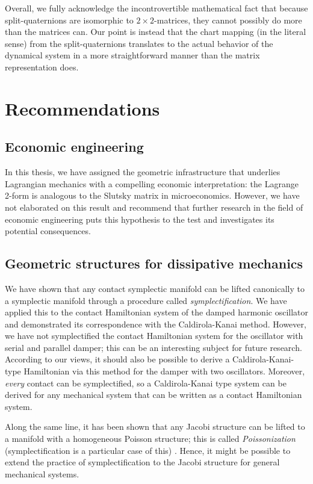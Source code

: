 Overall, we fully acknowledge the incontrovertible mathematical fact that because split-quaternions are isomorphic to $2\times2$-matrices, they cannot possibly do more than the matrices can. Our point is instead that the chart mapping (in the literal sense) from the split-quaternions translates to the actual behavior of the dynamical system in a more straightforward manner than the matrix representation does.

\clearpage
\section*{Recommendations}

\subsection*{Economic engineering}
In this thesis, we have assigned the geometric infrastructure that underlies Lagrangian mechanics with a compelling economic interpretation: the Lagrange 2-form is analogous to the Slutsky matrix in microeconomics. However, we have not elaborated on this result and recommend that further research in the field of economic engineering puts this hypothesis to the test and investigates its potential consequences.

\subsection*{Geometric structures for dissipative mechanics}
We have shown that any contact symplectic manifold can be lifted canonically to a symplectic manifold through a procedure called \emph{symplectification}. We have applied this to the contact Hamiltonian system of the damped harmonic oscillator and demonstrated its correspondence with the Caldirola-Kanai method. However, we have not symplectified the contact Hamiltonian system for the oscillator with serial and parallel damper; this can be an interesting subject for future research. According to our views, it should also be possible to derive a Caldirola-Kanai-type Hamiltonian via this method for the damper with two oscillators. Moreover, \emph{every} contact can be symplectified, so a Caldirola-Kanai type system can be derived for any mechanical system that can be written as a contact Hamiltonian system.

Along the same line, it has been shown that any Jacobi structure can be lifted to a manifold with a homogeneous Poisson structure; this is called \emph{Poissonization} (symplectification is a particular case of this) \cite{marle1991}. Hence, it might be possible to extend the practice of symplectification to the Jacobi structure for general mechanical systems. 

